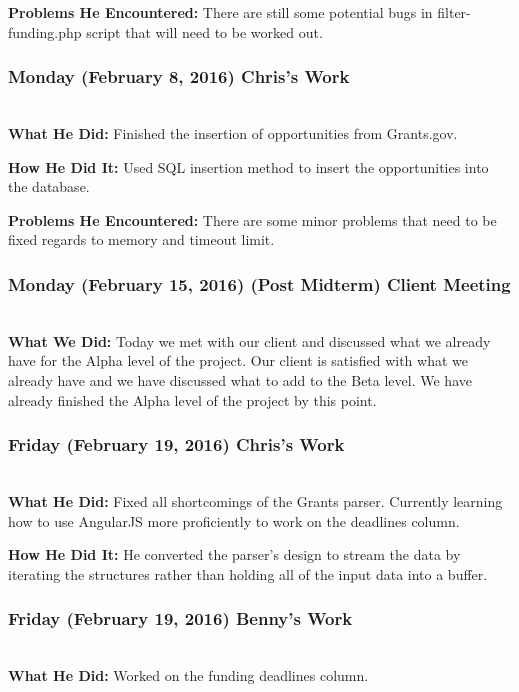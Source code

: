 \documentclass[onecolumn]{IEEEtran}
\begin{document}
	\textbf{Problems He Encountered: }
	There are still some potential bugs in filter-funding.php script that will need to be worked out.  

\subsubsection{Monday (February 8, 2016) Chris's Work  } \hspace*{\fill} \\
    \textbf{What He Did: } 
    Finished the insertion of opportunities from Grants.gov. 
    
	\textbf{How He Did It: }
	Used SQL insertion method to insert the opportunities into the database. 
    
	\textbf{Problems He Encountered: }
	There are some minor problems that need to be fixed regards to memory and timeout limit. 

\subsubsection{Monday (February 15, 2016) (Post Midterm) Client Meeting  } \hspace*{\fill} \\
    \textbf{What We Did: }
    Today we met with our client and discussed what we already have for the Alpha level of the project. Our client is satisfied with what we already have and we have discussed what to add to the Beta level. We have already finished the Alpha level of the project by this point. 

\subsubsection{Friday (February 19, 2016) Chris's Work  } \hspace*{\fill} \\
    \textbf{What He Did: } 
    Fixed all shortcomings of the Grants parser. Currently learning how to use AngularJS more proficiently to work on the deadlines column.  
    
	\textbf{How He Did It: }
	He converted the parser's design to stream the data by iterating the structures rather than holding all of the input data into a buffer.  

\subsubsection{Friday (February 19, 2016) Benny's Work  } \hspace*{\fill} \\
    \textbf{What He Did: } 
    Worked on the funding deadlines column.  
    
\end{document}

